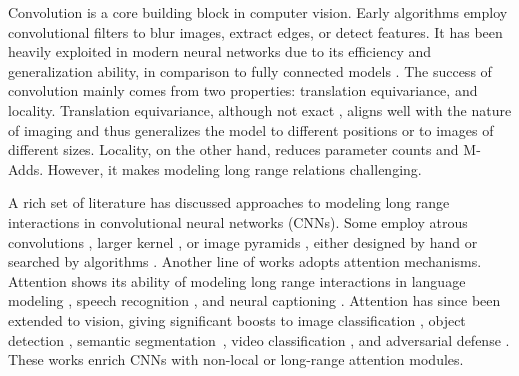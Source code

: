 \documentclass[runningheads]{llncs}
\begin{document}
Convolution is a core building block in computer vision. Early algorithms employ convolutional filters to blur images, extract edges, or detect features. It has been heavily exploited in modern neural networks \cite{lecun1998gradient,krizhevsky2012imagenet} due to its efficiency and generalization ability, in comparison to fully connected models \cite{ackley1985learning}. The success of convolution mainly comes from two properties: translation equivariance, and locality. Translation equivariance, although not exact \cite{zhang2019making}, aligns well with the nature of imaging and thus generalizes the model to different positions or to images of different sizes. Locality, on the other hand, reduces parameter counts and M-Adds. However, it makes modeling long range relations challenging.

A rich set of literature has discussed approaches to modeling long range interactions in convolutional neural networks (CNNs). Some employ atrous convolutions \cite{holschneider1990real,shensa1992discrete,papandreou2014untangling,deeplabv12015}, larger kernel \cite{peng2017large}, or image pyramids \cite{zhao2017pyramid,wang2019elastic}, either designed by hand or searched by algorithms \cite{zoph2017neural,chen2018searching,liu2019auto}. Another line of works adopts attention mechanisms. Attention shows its ability of modeling long range interactions in language modeling \cite{vaswani2017attention,wu2016google}, speech recognition \cite{chorowski2015attention,chan2016listen}, and neural captioning \cite{xu2015show}. Attention has since been extended to vision, giving significant boosts to image classification \cite{bello2019attention}, object detection \cite{hu2018relation}, semantic segmentation~\cite{huang2019ccnet}, video classification \cite{wang2018non}, and adversarial defense \cite{xie2019feature}. These works enrich CNNs with non-local or long-range attention modules.
\end{document}
